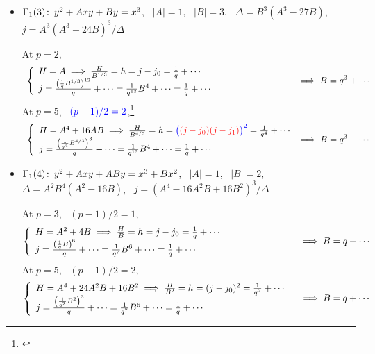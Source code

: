 \documentclass{rs}
\theoremstyle{definition}
\theoremstyle{remark}
\def\co{\colon\thinspace}
\renewcommand{\D}{\Delta}
\newcommand{\G}{\Gamma}
\renewcommand{\=}{\approx}
\renewcommand{\-}{\sim}
\newcommand{\rd}[1]{{\textcolor{red}{#1}}}
\newcommand{\bl}[1]{{\textcolor{blue}{#1}}}
\numberwithin{equation}{section}
\begin{document}
\begin{itemize}
 \item $\G_1(3) \co y^2 + A x y + B y = x^3$, \, $|A| = 1$, \, $|B| = 3$, \, $\Delta = B^3 (A^3 - 27 B)$, \, $j = A^3 (A^3 - 24 B)^3 / \D$ 

 At $p = 2$, 
 \[
  \hskip .15cm
  \left\{
   \begin{array}{l}
    H = A \implies \frac{H}{B^{1/3}} = h = j - j_0 = \frac{1}{q} + \cdots \\
    j = \frac{\left(\frac{1}{q} B^{1/3}\right)^{12}}{q} + \cdots = \frac{1}{q^{13}} B^4 + \cdots = \frac{1}{q} + \cdots 
   \end{array}
  \right. \hskip 3.05cm \implies B = q^3 + \cdots 
 \]
 At $p = 5$, \, $\bl{(p - 1) / 2 = 2}$,\footnote{\cite[V.4.1a]{AEC}} 
 \[
  \hskip .15cm
  \left\{
   \begin{array}{l}
    H = A^4 + 16 A B \implies \frac{H}{B^{4/3}} = h = \bl{\big(}\rd{(j - j_0) (j - j_1)}\bl{\big)^2} = \frac{1}{q^4} + \cdots \\
    j = \frac{\left(\frac{1}{q^4} B^{4/3}\right)^3}{q} + \cdots = \frac{1}{q^{13}} B^4 + \cdots = \frac{1}{q} + \cdots 
   \end{array}
  \right. \implies B = q^3 + \cdots 
 \]

 \item $\G_1(4) \co y^2 + A x y + A B y = x^3 + B x^2$, \, $|A| = 1$, \, $|B| = 2$, \, $\Delta = A^2 B^4 (A^2 - 16 B)$, \, $j = (A^4 - 16 A^2 B + 16 B^2)^3 / \D$ 

 At $p = 3$, \, $(p - 1) / 2 = 1$, 
 \[
  \left\{
   \begin{array}{l}
    H = A^2 + 4 B \implies \frac{H}{B} = h = j - j_0 = \frac{1}{q} + \cdots \\
    j = \frac{\left(\frac{1}{q} B\right)^6}{q} + \cdots = \frac{1}{q^7} B^6 + \cdots = \frac{1}{q} + \cdots 
   \end{array}
  \right. \hskip 2.7cm \implies B = q + \cdots 
 \]
 At $p = 5$, \, $(p - 1) / 2 = 2$, 
 \[
  \left\{
   \begin{array}{l}
    H = A^4 + 24 A^2 B + 16 B^2 \implies \frac{H}{B^2} = h = (j - j_0)^2 = \frac{1}{q^2} + \cdots \\
    j = \frac{\left(\frac{1}{q^2} B^2\right)^3}{q} + \cdots = \frac{1}{q^7} B^6 + \cdots = \frac{1}{q} + \cdots 
   \end{array}
  \right. \hskip .3cm \implies B = q + \cdots 
 \]
\end{itemize}
\end{document}
